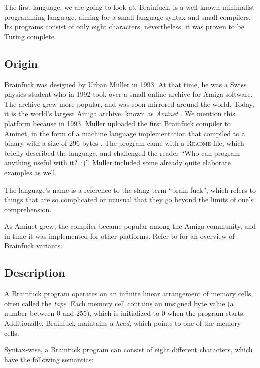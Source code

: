 The first language, we are going to look at, Brainfuck, is a well-known minimalist programming language, aiming for a small language syntax and small compilers. Its programs consist of only eight characters, nevertheless, it was proven to be Turing complete.

\subsection{Origin}

Brainfuck was designed by Urban Müller in 1993. At that time, he was a Swiss physics student who in 1992 took over a small online archive for Amiga software. The archive grew more popular, and was soon mirrored around the world. Today, it is the world's largest Amiga archive, known as \emph{Aminet} \cite{muller1993aminet}. We mention this platform because in 1993, Müller uploaded the first Brainfuck compiler to Aminet, in the form of a machine language implementation that compiled to a binary with a size of 296 bytes \cite{muller1993240}. The program came with a \textsc{Readme} file, which briefly described the language, and challenged the reader “Who can program anything useful with it?~:)”. Müller included some already quite elaborate examples as well.

The language's name is a reference to the slang term “brain fuck”, which refers to things that are so complicated or unusual that they go beyond the limits of one's comprehension.

As Aminet grew, the compiler became popular among the Amiga community, and in time it was implemented for other platforms. Refer to  for an overview of Brainfuck variants.

\subsection{Description}

A Brainfuck program operates on an infinite linear arrangement of memory cells, often called the \emph{tape}. Each memory cell contains an unsigned byte value (a number between 0 and 255), which is initialized to 0 when the program starts. Additionally, Brainfuck maintains a \emph{head}, which points to one of the memory cells.

Syntax-wise, a Brainfuck program can consist of eight different characters, which have the following semantics:

